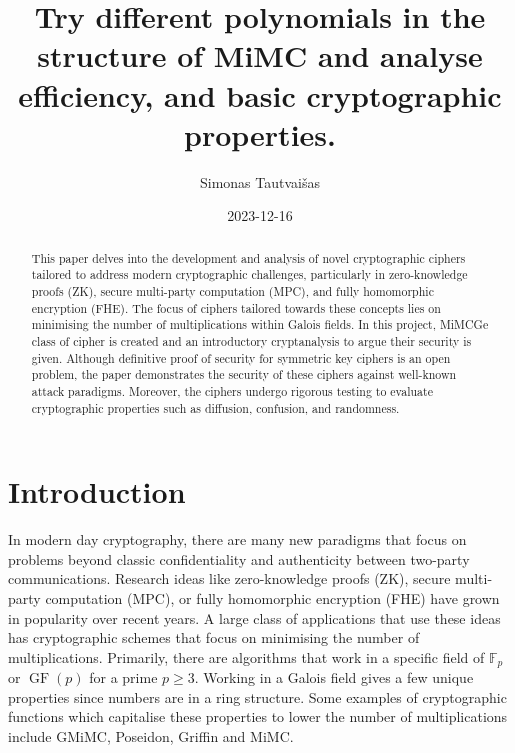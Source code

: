 \documentclass{Resources/UoBLab1}
\theoremstyle{definition}
\begin{document}

\title{Try different polynomials in the structure of MiMC and analyse efficiency, and basic cryptographic properties.}
\author{Simonas Tautvaišas}
\date{2023-12-16}

\maketitle

\begin{abstract}
    This paper delves into the development and analysis of novel cryptographic ciphers tailored to address modern cryptographic challenges, particularly in zero-knowledge proofs (ZK), secure multi-party computation (MPC), and fully homomorphic encryption (FHE). The focus of ciphers tailored towards these concepts lies on minimising the number of multiplications within Galois fields. In this project, MiMCGe class of cipher is created and an introductory cryptanalysis to argue their security is given. Although definitive proof of security for symmetric key ciphers is an open problem, the paper demonstrates the security of these ciphers against well-known attack paradigms. Moreover, the ciphers undergo rigorous testing to evaluate cryptographic properties such as diffusion, confusion, and randomness.
\end{abstract}

\section{Introduction}
In modern day cryptography, there are many new paradigms that focus on problems beyond classic confidentiality and authenticity between two-party communications. Research ideas like zero-knowledge proofs (ZK), secure multi-party computation (MPC), or fully homomorphic encryption (FHE) have grown in popularity over recent years. A large class of applications that use these ideas has cryptographic schemes that focus on minimising the number of multiplications. Primarily, there are algorithms that work in a specific field of $\mathbb{F}_p$ or $\operatorname{GF}(p)$ for a prime $p \geq 3$. Working in a Galois field gives a few unique properties since numbers are in a ring structure. Some examples of cryptographic functions which capitalise these properties to lower the number of multiplications include GMiMC\cite{GMiMC}, Poseidon\cite{Poseidon}, Griffin\cite{Griffin} and MiMC\cite{MiMC}.
\end{document}
